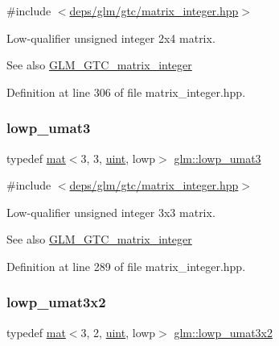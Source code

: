 {\ttfamily \#include $<$\hyperlink{matrix__integer_8hpp}{deps/glm/gtc/matrix\+\_\+integer.\+hpp}$>$}

Low-\/qualifier unsigned integer 2x4 matrix. \begin{DoxySeeAlso}{See also}
\hyperlink{group__gtc__matrix__integer}{G\+L\+M\+\_\+\+G\+T\+C\+\_\+matrix\+\_\+integer} 
\end{DoxySeeAlso}


Definition at line 306 of file matrix\+\_\+integer.\+hpp.

\mbox{\label{group__gtc__matrix__integer_gaab0c883cd04a3684accd02854daa7b1d}} 
\subsubsection{\texorpdfstring{lowp\+\_\+umat3}{lowp\_umat3}}
{\footnotesize\ttfamily typedef \hyperlink{structglm_1_1mat}{mat}$<$3, 3, \hyperlink{group__core__precision_ga4fd29415871152bfb5abd588334147c8}{uint}, lowp$>$ \hyperlink{group__gtc__matrix__integer_gaab0c883cd04a3684accd02854daa7b1d}{glm\+::lowp\+\_\+umat3}}



{\ttfamily \#include $<$\hyperlink{matrix__integer_8hpp}{deps/glm/gtc/matrix\+\_\+integer.\+hpp}$>$}

Low-\/qualifier unsigned integer 3x3 matrix. \begin{DoxySeeAlso}{See also}
\hyperlink{group__gtc__matrix__integer}{G\+L\+M\+\_\+\+G\+T\+C\+\_\+matrix\+\_\+integer} 
\end{DoxySeeAlso}


Definition at line 289 of file matrix\+\_\+integer.\+hpp.

\mbox{\label{group__gtc__matrix__integer_ga8beb1d63e9d2abe5659fe53ac064c6c5}} 
\subsubsection{\texorpdfstring{lowp\+\_\+umat3x2}{lowp\_umat3x2}}
{\footnotesize\ttfamily typedef \hyperlink{structglm_1_1mat}{mat}$<$3, 2, \hyperlink{group__core__precision_ga4fd29415871152bfb5abd588334147c8}{uint}, lowp$>$ \hyperlink{group__gtc__matrix__integer_ga8beb1d63e9d2abe5659fe53ac064c6c5}{glm\+::lowp\+\_\+umat3x2}}



